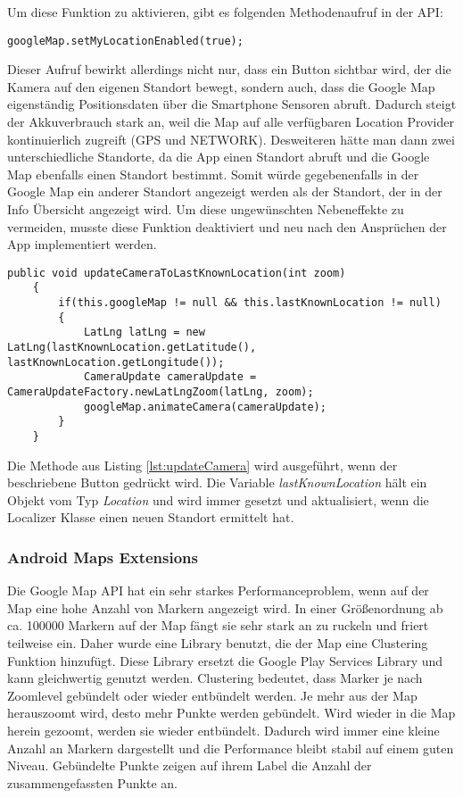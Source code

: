Um diese Funktion zu aktivieren, gibt es folgenden Methodenaufruf in der API: 

\begin{lstlisting}[caption={},label=lst:setMyLocationEnabled]
	googleMap.setMyLocationEnabled(true);
\end{lstlisting}

Dieser Aufruf bewirkt allerdings nicht nur, dass ein Button sichtbar wird, der die Kamera auf den eigenen Standort bewegt, sondern auch, dass die Google Map eigenständig Positionsdaten über die Smartphone Sensoren abruft. Dadurch steigt der Akkuverbrauch stark an, weil die Map auf alle verfügbaren Location Provider kontinuierlich zugreift (GPS und NETWORK). Desweiteren hätte man dann zwei unterschiedliche Standorte, da die App einen Standort abruft und die Google Map ebenfalls einen Standort bestimmt. Somit würde gegebenenfalls in der Google Map ein anderer Standort angezeigt werden als der Standort, der in der Info Übersicht angezeigt wird. Um diese ungewünschten Nebeneffekte zu vermeiden, musste diese Funktion deaktiviert und neu nach den Ansprüchen der App implementiert werden.

\begin{lstlisting}[caption={"Kamera auf letzte bekannte Position setzen"},label=lst:updateCamera]
	public void updateCameraToLastKnownLocation(int zoom)
	{
		if(this.googleMap != null && this.lastKnownLocation != null)
		{
			LatLng latLng = new LatLng(lastKnownLocation.getLatitude(), 					lastKnownLocation.getLongitude());
		    CameraUpdate cameraUpdate = CameraUpdateFactory.newLatLngZoom(latLng, zoom);
		    googleMap.animateCamera(cameraUpdate);
		}
	}
\end{lstlisting}

Die Methode aus Listing \ref{lst:updateCamera} wird ausgeführt, wenn der beschriebene Button gedrückt wird. Die Variable \textit{lastKnownLocation} hält ein Objekt vom Typ \textit{Location} und wird immer gesetzt und aktualisiert, wenn die Localizer Klasse einen neuen Standort ermittelt hat. 

\subsubsection{Android Maps Extensions}

Die Google Map API hat ein sehr starkes Performanceproblem, wenn auf der Map eine hohe Anzahl von Markern angezeigt wird. In einer Größenordnung ab ca. 100000 Markern auf der Map fängt sie sehr stark an zu ruckeln und friert teilweise ein. Daher wurde eine Library benutzt, die der Map eine Clustering Funktion hinzufügt. Diese Library ersetzt die Google Play Services Library und kann gleichwertig genutzt werden. Clustering bedeutet, dass Marker je nach Zoomlevel gebündelt oder wieder entbündelt werden. Je mehr aus der Map herauszoomt wird, desto mehr Punkte werden gebündelt. Wird wieder in die Map herein gezoomt, werden sie wieder entbündelt. Dadurch wird immer eine kleine Anzahl an Markern dargestellt und die Performance bleibt stabil auf einem guten Niveau. Gebündelte Punkte zeigen auf ihrem Label die Anzahl der zusammengefassten Punkte an.

